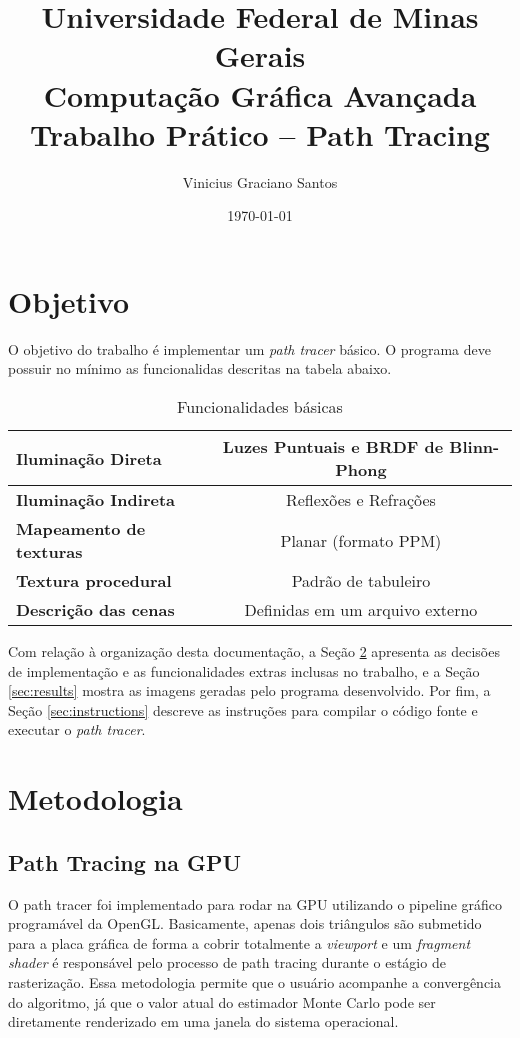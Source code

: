 \documentclass[11pt,a4paper]{article}
\author{Vinicius Graciano Santos}
\date{\today}
\title{Universidade Federal de Minas Gerais \\ Computação Gráfica Avançada \\ Trabalho Prático -- Path Tracing}
\begin{document}
\maketitle
\tableofcontents

\section{Objetivo}
O objetivo do trabalho é implementar um \textit{path tracer} básico. O programa deve possuir no mínimo as funcionalidas descritas na tabela abaixo.
\begin{table}[!htpb]
  \centering
  \begin{tabular}{l|c}
    \hline
    \textbf{Iluminação Direta} & Luzes Puntuais e BRDF de Blinn-Phong \\ \hline
    \textbf{Iluminação Indireta} & Reflexões e Refrações\\\hline
    \textbf{Mapeamento de texturas} & Planar (formato PPM)\\\hline
    \textbf{Textura procedural} & Padrão de tabuleiro\\ \hline
    \textbf{Descrição das cenas} & Definidas em um arquivo externo\\ \hline
  \end{tabular}
  \caption{Funcionalidades básicas}
  \label{tab:basic}
\end{table}

Com relação à organização desta documentação, a Seção \ref{sec:methods} apresenta as decisões de implementação e as funcionalidades extras inclusas no trabalho, e a Seção \ref{sec:results} mostra as imagens geradas pelo programa desenvolvido. Por fim, a Seção \ref{sec:instructions} descreve as instruções para compilar o código fonte e executar o \textit{path tracer}.

\section{Metodologia}
\label{sec:methods}
\subsection{Path Tracing na GPU}
O path tracer foi implementado para rodar na GPU utilizando o pipeline gráfico programável da OpenGL. Basicamente, apenas dois triângulos são submetido para a placa gráfica de forma a cobrir totalmente a \textit{viewport} e um \textit{fragment shader} é responsável pelo processo de path tracing durante o estágio de rasterização. Essa metodologia permite que o usuário acompanhe a convergência do algoritmo, já que o valor atual do estimador Monte Carlo pode ser diretamente renderizado em uma janela do sistema operacional.
\end{document}

